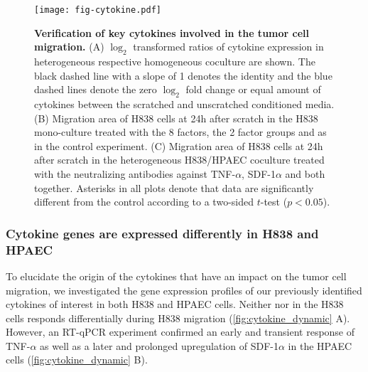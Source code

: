 \begin{figure}
\begin{center}
\texttt{[image: fig-cytokine.pdf]}
\end{center}
\caption[Verification of key cytokines]{
{\bf Verification of key cytokines involved in the tumor cell migration.} 
(A) $\log_2$ transformed ratios of cytokine expression in heterogeneous respective
homogeneous coculture are shown. The black dashed line with a slope of 1 denotes 
the identity and the blue dashed lines denote the zero $\log_2$ fold change
or equal amount of cytokines between the scratched and unscratched conditioned 
media.
(B) Migration area of H838 cells at 24h after scratch in the H838 mono-culture 
treated with the 8
factors, the 2 factor groups and as in the control experiment.
(C) Migration area of H838 cells at 24h after scratch in the heterogeneous 
H838/HPAEC coculture 
treated with the neutralizing antibodies against TNF-$\alpha$, SDF-1$\alpha$
and both together. Asterisks in all plots denote that data are significantly 
different from the control according to a two-sided $t$-test ($p < 0.05$).
}
\label{fig:cytokine}
\end{figure}

\subsubsection{Cytokine genes are expressed differently in H838 and HPAEC}

To elucidate the origin of the cytokines that have an impact on the tumor
cell migration,
we investigated the gene expression profiles of
our previously identified cytokines of interest in both H838 and HPAEC cells. 
Neither \tnfa nor \sdfonea in the H838 cells
responds differentially during H838 migration (\ref{fig:cytokine_dynamic} A).
However, 
an RT-qPCR experiment confirmed an early and transient response of  
TNF-$\alpha$ as well as a later and prolonged upregulation of 
SDF-1$\alpha$ in the HPAEC cells (\ref{fig:cytokine_dynamic} B). 

